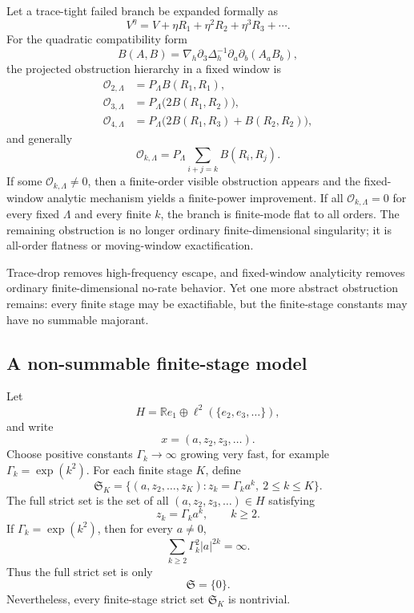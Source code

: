 \documentclass[11pt]{article}
\numberwithin{equation}{section}
\newcommand{\R}{\mathbb R}
\newcommand{\nabh}{\nabla_h}
\newcommand{\calO}{\mathcal O}
\newcommand{\frakS}{\mathfrak S}
\begin{document}
Let a trace-tight failed branch be expanded formally as
\[
V^\eta=V+\eta R_1+\eta^2R_2+\eta^3R_3+\cdots.
\]
For the quadratic compatibility form
\[
B(A,B)=\nabh\partial_3\Delta_h^{-1}\partial_a\partial_b(A_aB_b),
\]
the projected obstruction hierarchy in a fixed window is
\begin{align*}
\calO_{2,\Lambda}&=P_\Lambda B(R_1,R_1),\\
\calO_{3,\Lambda}&=P_\Lambda\bigl(2B(R_1,R_2)\bigr),\\
\calO_{4,\Lambda}&=P_\Lambda\bigl(2B(R_1,R_3)+B(R_2,R_2)\bigr),
\end{align*}
and generally
\begin{equation}\label{eq:obstruction-hierarchy}
\calO_{k,\Lambda}=P_\Lambda\sum_{i+j=k}B(R_i,R_j).
\end{equation}
If some \(\calO_{k,\Lambda}\ne0\), then a finite-order visible obstruction appears and the fixed-window analytic mechanism yields a finite-power improvement.  If all \(\calO_{k,\Lambda}=0\) for every fixed \(\Lambda\) and every finite \(k\), the branch is finite-mode flat to all orders.  The remaining obstruction is no longer ordinary finite-dimensional singularity; it is all-order flatness or moving-window exactification.

\label{sec:all-order-flat}

Trace-drop removes high-frequency escape, and fixed-window analyticity removes ordinary finite-dimensional no-rate behavior.  Yet one more abstract obstruction remains: every finite stage may be exactifiable, but the finite-stage constants may have no summable majorant.

\subsection{A non-summable finite-stage model}

Let
\[
H=\R e_1\oplus\ell^2(\{e_2,e_3,\ldots\}),
\]
and write
\[
x=(a,z_2,z_3,\ldots).
\]
Choose positive constants \(\Gamma_k\to\infty\) growing very fast, for example \(\Gamma_k=\exp(k^2)\).  For each finite stage \(K\), define
\begin{equation}\label{eq:finite-stage-SK}
\frakS_K=\{(a,z_2,\ldots,z_K):z_k=\Gamma_ka^k,
\ 2\le k\le K\}.
\end{equation}
The full strict set is the set of all \((a,z_2,z_3,\ldots)\in H\) satisfying
\begin{equation}\label{eq:full-strict-nonsummable}
z_k=\Gamma_ka^k,
\qquad k\ge2.
\end{equation}
If \(\Gamma_k=\exp(k^2)\), then for every \(a\ne0\),
\[
\sum_{k\ge2}\Gamma_k^2|a|^{2k}=\infty.
\]
Thus the full strict set is only
\[
\frakS=\{0\}.
\]
Nevertheless, every finite-stage strict set \(\frakS_K\) is nontrivial.
\end{document}
